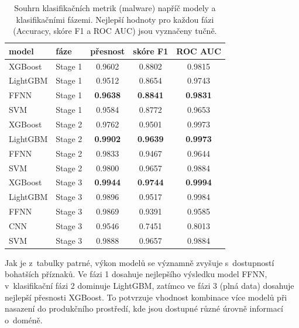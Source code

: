 \begin{table}[H]
\centering
\small
\begin{tabular}{|l|l|c|c|c|}
\hline
\textbf{model} & \textbf{fáze} & \textbf{přesnost} & \textbf{skóre F1} & \textbf{ROC AUC} \\
\hline
XGBoost  & Stage 1 & 0.9602          & 0.8802          & 0.9815          \\
LightGBM & Stage 1 & 0.9512          & 0.8654          & 0.9743          \\
FFNN     & Stage 1 & \textbf{0.9638} & \textbf{0.8841} & \textbf{0.9831} \\
SVM      & Stage 1 & 0.9584          & 0.8772          & 0.9653          \\
\hline
XGBoost  & Stage 2 & 0.9762          & 0.9501          & 0.9973          \\
LightGBM & Stage 2 & \textbf{0.9902} & \textbf{0.9639} & \textbf{0.9973} \\
FFNN     & Stage 2 & 0.9833          & 0.9467          & 0.9644          \\
SVM      & Stage 2 & 0.9800          & 0.9657          & 0.9884          \\
\hline
XGBoost  & Stage 3 & \textbf{0.9944} & \textbf{0.9744}  & \textbf{0.9994} \\
LightGBM & Stage 3 & 0.9896          & 0.9517          & 0.9984          \\
FFNN     & Stage 3 & 0.9869          & 0.9391          & 0.9585          \\
CNN      & Stage 3 & 0.9546          & 0.7451          & 0.8013          \\
SVM      & Stage 3 & 0.9888          & 0.9657          & 0.9884          \\
\hline
\end{tabular}
\caption{Souhrn klasifikačních metrik (malware) napříč modely a klasifikačními fázemi. Nejlepší hodnoty pro každou fázi (Accuracy, skóre F1 a ROC AUC) jsou vyznačeny tučně.}
\label{tab:summary_malware_stages}
\end{table}

Jak je z~tabulky patrné, výkon modelů se významně zvyšuje s~dostupností bohatších příznaků. Ve fázi 1 dosahuje nejlepšího výsledku model FFNN, v~klasifikační fázi 2 dominuje LightGBM, zatímco ve fázi 3 (plná data) dosahuje nejlepší přesnosti XGBoost. To potvrzuje vhodnost kombinace více modelů při nasazení do produkčního prostředí, kde jsou dostupné různé úrovně informací o~doméně.



